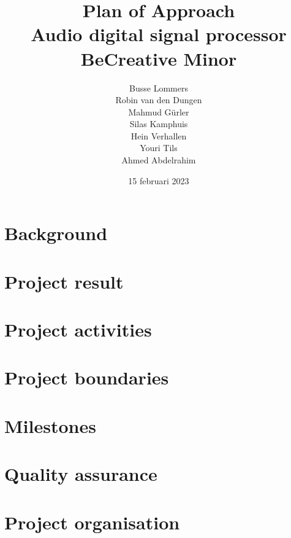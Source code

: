 \documentclass[11pt, a4paper]{report}
\begin{document}
\title{%
  Plan of Approach\\
  \large Audio digital signal processor \\
  BeCreative Minor}
\author{Busse Lommers \\
Robin van den Dungen \\
Mahmud Gürler \\
Silas Kamphuis \\
Hein Verhallen \\
Youri Tils \\
Ahmed Abdelrahim}
\date{15 februari 2023}
\maketitle
\tableofcontents

\chapter{Background}
	
	
\chapter{Project result}
	
	
\chapter{Project activities}
	

\chapter{Project boundaries}
	
	
\chapter{Milestones}
	

\chapter{Quality assurance}
	

\chapter{Project organisation}
	
\end{document}
